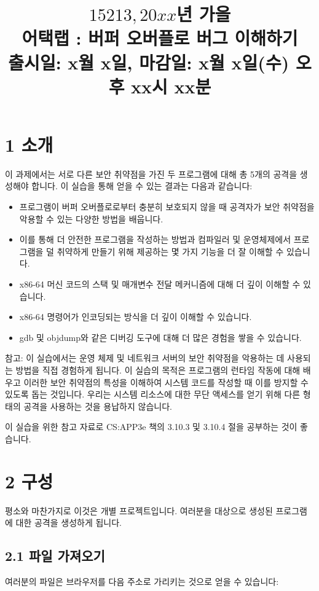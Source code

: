 \documentclass[10pt]{article}
\title{
 $15213,20xx$년 가을 \\
 어택랩 : 버퍼 오버플로 버그 이해하기 \\
 출시일: x월 x일, 마감일: x월 x일(수) 오후 xx시 xx분}
\author{}
\date{}
\begin{document}
\maketitle
\section*{1 소개}
이 과제에서는 서로 다른 보안 취약점을 가진 두 프로그램에 대해 총 5개의 공격을 생성해야 합니다. 이 실습을 통해 얻을 수 있는 결과는 다음과 같습니다:

\begin{itemize}
  \item 프로그램이 버퍼 오버플로로부터 충분히 보호되지 않을 때 공격자가 보안 취약점을 악용할 수 있는 다양한 방법을 배웁니다.
\item 이를 통해 더 안전한 프로그램을 작성하는 방법과 컴파일러 및 운영체제에서 프로그램을 덜 취약하게 만들기 위해 제공하는 몇 가지 기능을 더 잘 이해할 수 있습니다.
\item x86-64 머신 코드의 스택 및 매개변수 전달 메커니즘에 대해 더 깊이 이해할 수 있습니다.
\item x86-64 명령어가 인코딩되는 방식을 더 깊이 이해할 수 있습니다.
 \item gdb 및 objdump와 같은 디버깅 도구에 대해 더 많은 경험을 쌓을 수 있습니다.
\end{itemize}

\noindent
참고: 이 실습에서는 운영 체제 및 네트워크 서버의 보안 취약점을 악용하는 데 사용되는 방법을 직접 경험하게 됩니다. 이 실습의 목적은 프로그램의 런타임 작동에 대해 배우고 이러한 보안 취약점의 특성을 이해하여 시스템 코드를 작성할 때 이를 방지할 수 있도록 돕는 것입니다. 우리는 시스템 리소스에 대한 무단 액세스를 얻기 위해 다른 형태의 공격을 사용하는 것을 용납하지 않습니다.

\noindent
이 실습을 위한 참고 자료로 CS:APP3e 책의 3.10.3 및 3.10.4 절을 공부하는 것이 좋습니다.

\section*{2 구성}
평소와 마찬가지로 이것은 개별 프로젝트입니다. 여러분을 대상으로 생성된 프로그램에 대한 공격을 생성하게 됩니다.

\subsection*{2.1 파일 가져오기}
여러분의 파일은 브라우저를 다음 주소로 가리키는 것으로 얻을 수 있습니다:
\end{document}
